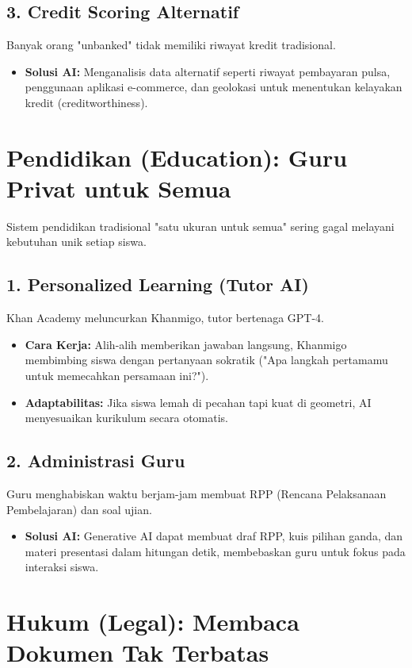 \subsection{3. Credit Scoring Alternatif}
Banyak orang "unbanked" tidak memiliki riwayat kredit tradisional.
\begin{itemize}
    \item \textbf{Solusi AI:} Menganalisis data alternatif seperti riwayat pembayaran pulsa, penggunaan aplikasi e-commerce, dan geolokasi untuk menentukan kelayakan kredit (creditworthiness).
\end{itemize}

\section{Pendidikan (Education): Guru Privat untuk Semua}

Sistem pendidikan tradisional "satu ukuran untuk semua" sering gagal melayani kebutuhan unik setiap siswa.

\subsection{1. Personalized Learning (Tutor AI)}
Khan Academy meluncurkan Khanmigo, tutor bertenaga GPT-4.
\begin{itemize}
    \item \textbf{Cara Kerja:} Alih-alih memberikan jawaban langsung, Khanmigo membimbing siswa dengan pertanyaan sokratik ("Apa langkah pertamamu untuk memecahkan persamaan ini?").
    \item \textbf{Adaptabilitas:} Jika siswa lemah di pecahan tapi kuat di geometri, AI menyesuaikan kurikulum secara otomatis.
\end{itemize}

\subsection{2. Administrasi Guru}
Guru menghabiskan waktu berjam-jam membuat RPP (Rencana Pelaksanaan Pembelajaran) dan soal ujian.
\begin{itemize}
    \item \textbf{Solusi AI:} Generative AI dapat membuat draf RPP, kuis pilihan ganda, dan materi presentasi dalam hitungan detik, membebaskan guru untuk fokus pada interaksi siswa.
\end{itemize}

\section{Hukum (Legal): Membaca Dokumen Tak Terbatas}


